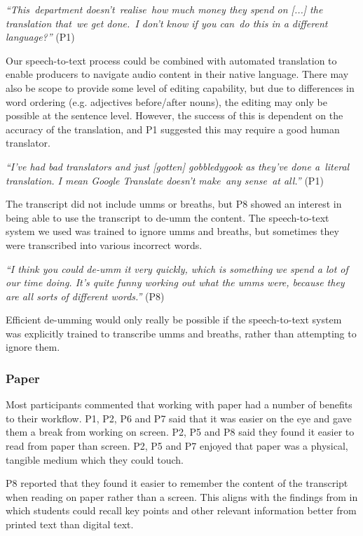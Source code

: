 \textit{``This department doesn't realise how much money they spend on [...] the translation that we get done. I don't
know if you can do this in a different language?''} (P1)

Our speech-to-text process could be combined with automated translation to enable producers to navigate audio content
in their native language. There may also be scope to provide some level of editing capability, but due to differences
in word ordering (e.g. adjectives before/after nouns), the editing may only be possible at the sentence level. However,
the success of this is dependent on the accuracy of the translation, and P1 suggested this may require a good human
translator.

\textit{``I've had bad translators and just [gotten] gobbledygook as they've done a literal translation. I mean Google
Translate doesn't make any sense at all.''} (P1)


The transcript did not include umms or breaths, but P8 showed an interest in being able to use the transcript to de-umm
the content. The speech-to-text system we used was trained to ignore umms and breaths, but sometimes they were
transcribed into various incorrect words.

\textit{``I think you could de-umm it very quickly, which is something we spend a lot of our time doing.  It's quite
funny working out what the umms were, because they are all sorts of different words.''} (P8)

Efficient de-umming would only really be possible if the speech-to-text system was explicitly trained to transcribe
umms and breaths, rather than attempting to ignore them.

\subsubsection{Paper}


Most participants commented that working with paper had a number of benefits to their workflow. P1, P2, P6 and P7 said
that it was easier on the eye and gave them a break from working on screen. P2, P5 and P8 said they found it easier to
read from paper than screen. P2, P5 and P7 enjoyed that paper was a physical, tangible medium which they could touch.

P8 reported that they found it easier to remember the content of the transcript when reading on paper rather than a
screen.  This aligns with the findings from \citet{Singer2017} in which students could recall key points and other
relevant information better from printed text than digital text.

